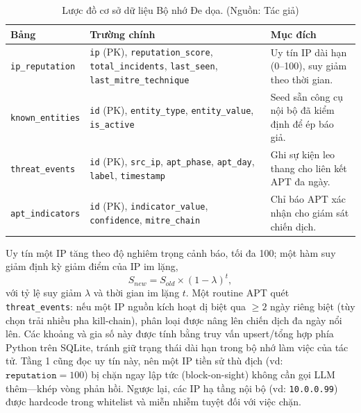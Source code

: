 \begin{table}[!htbp]
    \centering
    \caption{Lược đồ cơ sở dữ liệu Bộ nhớ Đe dọa. (Nguồn: Tác giả)}
    \label{tab:threat_memory_schema}
    \begin{tabular}{|>{\raggedright\arraybackslash}p{}|>{\raggedright\arraybackslash}p{}|>{\raggedright\arraybackslash}p{}|}
        \hline
        \textbf{Bảng} & \textbf{Trường chính} & \textbf{Mục đích} \\
        \hline
        \texttt{ip\_reputation} & \texttt{ip} (PK), \texttt{reputation\_score}, \texttt{total\_incidents}, \texttt{last\_seen}, \texttt{last\_mitre\_technique} & Uy tín IP dài hạn (0--100), suy giảm theo thời gian. \\ \hline
        \texttt{known\_entities} & \texttt{id} (PK), \texttt{entity\_type}, \texttt{entity\_value}, \texttt{is\_active} & Seed sẵn công cụ nội bộ đã kiểm định để ép báo giả. \\ \hline
        \texttt{threat\_events} & \texttt{id} (PK), \texttt{src\_ip}, \texttt{apt\_phase}, \texttt{apt\_day}, \texttt{label}, \texttt{timestamp} & Ghi sự kiện leo thang cho liên kết APT đa ngày. \\ \hline
        \texttt{apt\_indicators} & \texttt{id} (PK), \texttt{indicator\_value}, \texttt{confidence}, \texttt{mitre\_chain} & Chỉ báo APT xác nhận cho giám sát chiến dịch. \\ \hline
    \end{tabular}
\end{table}

Uy tín một IP tăng theo độ nghiêm trọng cảnh báo, tối đa 100; một hàm suy giảm định kỳ giảm điểm của IP im lặng,
\begin{equation}
    S_{new} = S_{old} \times (1 - \lambda)^{t},
\end{equation}
với tỷ lệ suy giảm $\lambda$ và thời gian im lặng $t$. Một routine APT quét \texttt{threat\_events}: nếu một IP nguồn kích hoạt dị biệt qua $\ge\!2$ ngày riêng biệt (tùy chọn trải nhiều pha kill-chain), phân loại được nâng lên chiến dịch đa ngày nổi lên. Các khoảng và gia số này được tính bằng truy vấn upsert/tổng hợp phía Python trên SQLite, tránh giữ trạng thái dài hạn trong bộ nhớ làm việc của tác tử. Tầng 1 cũng đọc uy tín này, nên một IP tiền sử thù địch (vd: $\texttt{reputation}=100$) bị chặn ngay lập tức (block-on-sight) không cần gọi LLM thêm---khép vòng phản hồi. Ngược lại, các IP hạ tầng nội bộ (vd: \texttt{10.0.0.99}) được hardcode trong whitelist và miễn nhiễm tuyệt đối với việc chặn.

